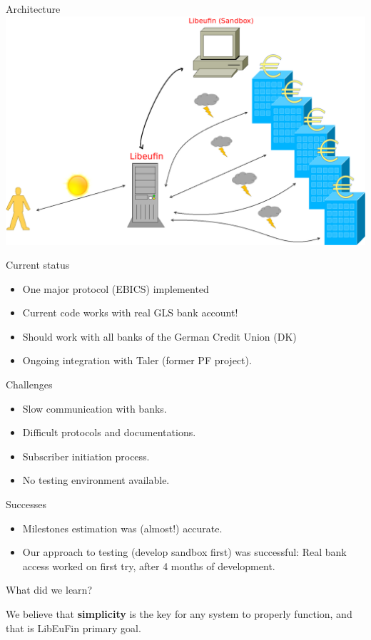 \documentclass[pdf]{beamer}
\begin{document}
\begin{frame}{Architecture}
  \includegraphics[height=0.63\textheight]{libeufin.png}
\end{frame}

\begin{frame}{Current status}
  \begin{itemize}
    \item One major protocol (EBICS) implemented
    \item Current code works with real GLS bank account!
    \item Should work with all banks of the German Credit Union (DK)
    \item Ongoing integration with Taler (former PF project).
  \end{itemize}
\end{frame}

\begin{frame}{Challenges}
  \begin{itemize}
    \item Slow communication with banks.
    \item Difficult protocols and documentations.
    \item Subscriber initiation process.
    \item No testing environment available.
  \end{itemize}
\end{frame}

\begin{frame}{Successes}
  \begin{itemize}
    \item Milestones estimation was (almost!) accurate.
    \item Our approach to testing (develop sandbox first) was successful: Real bank access
          worked on first try, after 4 months of development.
  \end{itemize}
\end{frame}

\begin{frame}{What did we learn?}
  \begin{center}
  We believe that \textbf{simplicity} is the key for any system to
  properly function, and that is LibEuFin primary goal.
  \end{center}
\end{frame}
\end{document}
